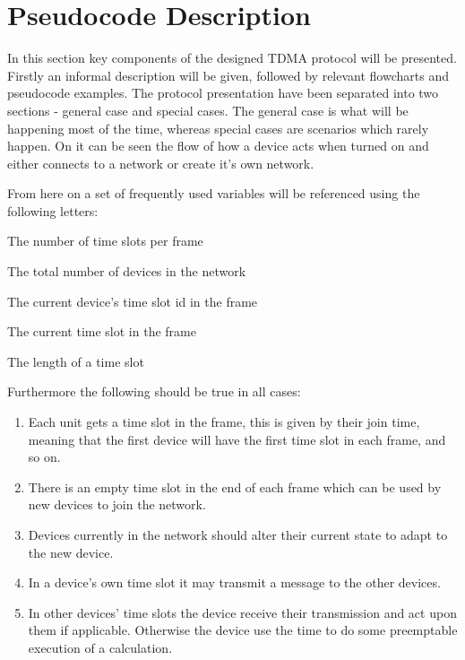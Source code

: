 \section{Pseudocode Description}
In this section key components of the designed TDMA protocol will be presented.
Firstly an informal description will be given, followed by relevant flowcharts and pseudocode examples.
The protocol presentation have been separated into two sections - general case and special cases. 
The general case is what will be happening most of the time, whereas special cases are scenarios which rarely happen.
On  it can be seen the flow of how a device acts when turned on and either connects to a network or create it's own network.


From here on a set of frequently used variables will be referenced using the following letters: 
\begin{description}[labelindent=\parindent]
    \item[$n$] The number of time slots per frame
    \item[$d$] The total number of devices in the network
    \item[$k$] The current device's time slot id in the frame
    \item[$i$] The current time slot in the frame
    \item[$\delta$] The length of a time slot
\end{description}  
\noindent
Furthermore the following should be true in all cases: 
\begin{enumerate}[label=\itshape \alph*\upshape)]
    \item Each unit gets a time slot in the frame, this is given by their join time, meaning that the first device will have the first time slot in each frame, and so on.
    \item There is an empty time slot in the end of each frame which can be used by new devices to join the network.
    \item Devices currently in the network should alter their current state to adapt to the new device.
    \item In a device's own time slot it may transmit a message to the other devices.
    \item In other devices' time slots the device receive their transmission and act upon them if applicable. Otherwise the device use the time to do some preemptable execution of a calculation.
\end{enumerate}
                    
